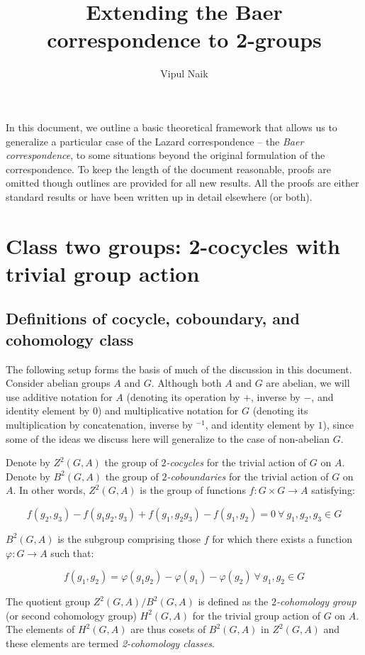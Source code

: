 \documentclass[10pt]{amsart}
\title{Extending the Baer correspondence to 2-groups}
\author{Vipul Naik}
\begin{document}
\maketitle

In this document, we outline a basic theoretical framework that allows
us to generalize a particular case of the Lazard correspondence -- the
{\em Baer correspondence}, to some situations beyond the original
formulation of the correspondence. To keep the length of the document
reasonable, proofs are omitted though outlines are provided for all
new results. All the proofs are either standard results or have been
written up in detail elsewhere (or both).

\section{Class two groups: 2-cocycles with trivial group action}

\subsection{Definitions of cocycle, coboundary, and cohomology class}

The following setup forms the basis of much of the discussion in this
document. Consider abelian groups $A$ and $G$. Although both $A$ and
$G$ are abelian, we will use additive notation for $A$ (denoting its
operation by $+$, inverse by $-$, and identity element by $0$) and
multiplicative notation for $G$ (denoting its multiplication by
concatenation, inverse by ${}^{-1}$, and identity element by $1$), since
some of the ideas we discuss here will generalize to the case of
non-abelian $G$.

Denote by $Z^2(G,A)$ the group of {\em $2$-cocycles} for the trivial
action of $G$ on $A$. Denote by $B^2(G,A)$ the group of {\em
$2$-coboundaries} for the trivial action of $G$ on $A$. In other
words, $Z^2(G,A)$ is the group of functions $f:G \times G \to A$
satisfying:

$$f(g_2,g_3) - f(g_1g_2,g_3) + f(g_1,g_2g_3) - f(g_1,g_2) = 0 \ \forall \ g_1,g_2,g_3 \in G$$

$B^2(G,A)$ is the subgroup comprising those $f$ for which there exists
a function $\varphi:G \to A$ such that:

$$f(g_1,g_2) = \varphi(g_1g_2) - \varphi(g_1) - \varphi(g_2) \ \forall \ g_1, g_2 \in G$$

The quotient group $Z^2(G,A)/B^2(G,A)$ is defined as the {\em
$2$-cohomology group} (or second cohomology group) $H^2(G,A)$ for the
trivial group action of $G$ on $A$. The elements of $H^2(G,A)$ are
thus cosets of $B^2(G,A)$ in $Z^2(G,A)$ and these elements are termed
{\em 2-cohomology classes}.
\end{document}
